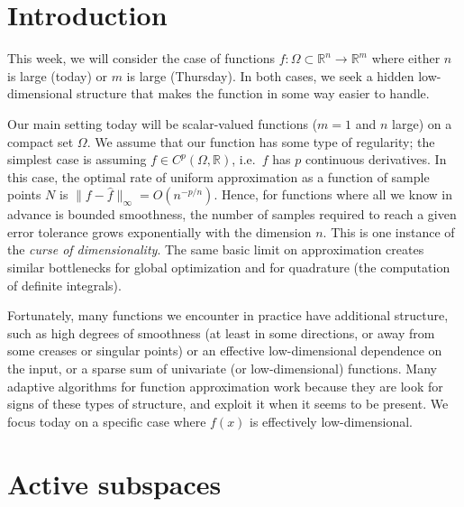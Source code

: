 \documentclass[12pt, leqno]{article} %
\begin{document}

\section{Introduction}


This week, we will consider the case of functions
$f : \Omega \subset \mathbb{R}^n \rightarrow \mathbb{R}^m$ where
either $n$ is large (today) or $m$ is large (Thursday).  In both
cases, we seek a hidden low-dimensional structure that makes the
function in some way easier to handle.

Our main setting today will be scalar-valued functions ($m = 1$ and
$n$ large) on a compact set $\Omega$.  We assume that our function has
some type of regularity; the simplest case is assuming $f \in
C^p(\Omega, \mathbb{R})$, i.e.~$f$ has $p$ continuous derivatives.  In
this case, the optimal rate of uniform approximation as a function of
sample points $N$ is $\|f-\hat{f}\|_\infty = O(n^{-p/n})$.  Hence, for
functions where all we know in advance is bounded smoothness, the
number of samples required to reach a given error tolerance grows
exponentially with the dimension $n$.  This is one instance of the
{\em curse of dimensionality}.  The same basic limit on approximation
creates similar bottlenecks for global optimization and for quadrature
(the computation of definite integrals).

Fortunately, many functions we encounter in practice have additional
structure, such as high degrees of smoothness (at least in some
directions, or away from some creases or singular points) or an
effective low-dimensional dependence on the input, or a sparse sum of
univariate (or low-dimensional) functions.  Many adaptive algorithms
for function approximation work because they are look for signs of
these types of structure, and exploit it when it seems to be present.
We focus today on a specific case where $f(x)$ is effectively
low-dimensional.

\section{Active subspaces}
\end{document}
